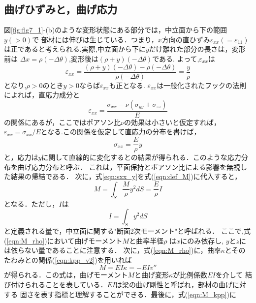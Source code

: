 \documentclass[10pt,a4j]{jarticle}
\begin{document}
\subsection{曲げひずみと，曲げ応力}
図\ref{fig:fig7_1}-(b)のような変形状態にある部分では，中立面から下の範囲$y(>0)$で
部材には伸びは生じている．つまり，$x$方向の直ひずみ$\varepsilon_{xx}(=\varepsilon_{11})$
は正であると考えられる.実際,中立面から下に$y$だけ離れた部分の長さは，変形前は
$\Delta x=\rho (-\Delta \theta)$,変形後は$(\rho + y )(-\Delta \theta)$である.
よって,$\varepsilon_{xx}$は
\begin{equation}
	\varepsilon_{xx}
	=
	\frac{(\rho +y )(-\Delta \theta) - \rho (-\Delta \theta)}{\rho (-\Delta \theta)}
	=
	\frac{y}{\rho}
\end{equation}
となり,$\rho>0$のとき$y>0$ならば$\varepsilon_{xx}$も正となる.
$\varepsilon_{xx}$は一般化されたフックの法則によれば，直応力成分と
\begin{equation}
	\varepsilon_{xx}=\frac{\sigma_{xx}-\nu(\sigma_{yy}+\sigma_{zz})}{E}
\end{equation}
の関係にあるが，ここではポアソン比$\nu$の効果は小さいと仮定すれば，
$\varepsilon_{xx}=\sigma_{xx}/E$となる.この関係を仮定して直応力の分布を書けば，
\begin{equation}
	\sigma_{xx}=\frac{E}{\rho}y
	\label{eqn:sxx_y}
\end{equation}
と，応力は$y$に関して直線的に変化するとの結果が得られる．このような応力分布を曲げ応力分布と呼ぶ．
これは，平面保持とポアソン比による影響を無視した結果の帰結である．
次に，式\ref{eqn:sxx_y}を式(\ref{eqn:def_M})に代入すると，
\begin{equation}
	M=\int_S \frac{M}{\rho}y^2 dS=\frac{E}{\rho}I
	\label{eqn:M_rho}
\end{equation}
となる．ただし，$I$は
\begin{equation}
	I=\int_S y^2 dS
	\label{eqn:def_I}
\end{equation}
と定義される量で，中立面に関する"断面2次モーメント"と呼ばれる．
ここで,式(\ref{eqn:M_rho})において曲げモーメント$M$と曲率半径$\rho$
は$x$にのみ依存し, $y$と$z$には依らない量であることに注意する．
次に，式(\ref{eqn:M_rho})に，曲率$\kappa$とそのたわみとの関係(\ref{eqn:kpp_v2})を用いれば
\begin{equation}
	M = EI \kappa = -EIv''
	\label{eqn:M_kpp}
\end{equation}
が得られる．この式は，曲げモーメント$M$と曲げ変形$\kappa$が比例係数$EI$を介して
結び付けられることを表している．$EI$は梁の曲げ剛性と呼ばれ，部材の曲げに対する
固さを表す指標と理解することができる．最後に，式(\ref{eqn:M_kpp})に
\end{document}
